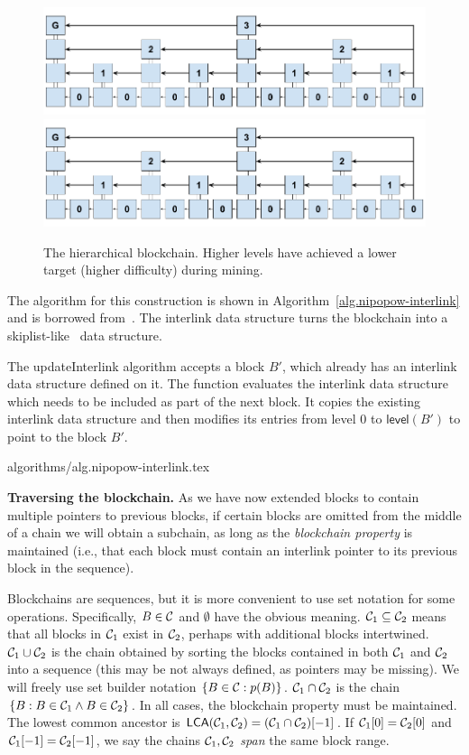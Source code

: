 \begin{figure}
    \caption{The hierarchical blockchain.
    Higher levels have achieved a lower target (higher difficulty) during mining.}
    \centering
    \iftwocolumn
        \includegraphics[width=0.9\columnwidth,keepaspectratio]{figures/hierarchical-ledger.png}
    \else
        \includegraphics[width=0.7\columnwidth,keepaspectratio]{figures/hierarchical-ledger.png}
    \fi
    \label{fig.hierarchy}
\end{figure}

The algorithm for this construction is shown in
Algorithm~\ref{alg.nipopow-interlink} and is borrowed from~\cite{KLS}. The
interlink data structure turns the blockchain into a
skiplist-like~\cite{skiplist} data structure.

The updateInterlink algorithm accepts a block $B'$, which already has an
interlink data structure defined on it. The function evaluates the
interlink data structure which needs to be included as part of the next block.
It copies the existing interlink data structure and
then modifies its entries from level $0$ to $\textsf{level}(B')$ to
point to the block $B'$.

{algorithms/alg.nipopow-interlink.tex}

\noindent\textbf{Traversing the blockchain. }
As we have now extended blocks to contain multiple pointers to previous blocks,
if certain blocks are omitted from the middle of a chain we will obtain a
subchain, as long as the \emph{blockchain property} is maintained (i.e., that
each block must contain an interlink pointer to its previous block in the
sequence).

Blockchains are sequences, but it is more convenient to use set notation for
some operations. Specifically, $B \in \mathcal{C}$ and $\emptyset$ have the obvious
meaning. $\mathcal{C}_1 \subseteq \mathcal{C}_2$ means that all blocks in $\mathcal{C}_1$ exist
in $\mathcal{C}_2$, perhaps with additional blocks intertwined. $\mathcal{C}_1 \cup
\mathcal{C}_2$ is the chain obtained by sorting the blocks contained in both
$\mathcal{C}_1$ and $\mathcal{C}_2$ into a sequence (this may be not always defined, as
pointers may be missing). We will freely use set builder notation $\{B \in
\mathcal{C}: p(B)\}$. $\mathcal{C}_1 \cap \mathcal{C}_2$ is the chain $\{B: B \in \mathcal{C}_1
\land B \in \mathcal{C}_2\}$. In all cases, the blockchain property must be
maintained. The lowest common ancestor is $\textsf{LCA}(\mathcal{C}_1, \mathcal{C}_2) =
(\mathcal{C}_1 \cap \mathcal{C}_2)[-1]$. If $\mathcal{C}_1[0] = \mathcal{C}_2[0]$ and $\mathcal{C}_1[-1]
= \mathcal{C}_2[-1]$, we say the chains $\mathcal{C}_1, \mathcal{C}_2$ \textit{span} the same
block range.

